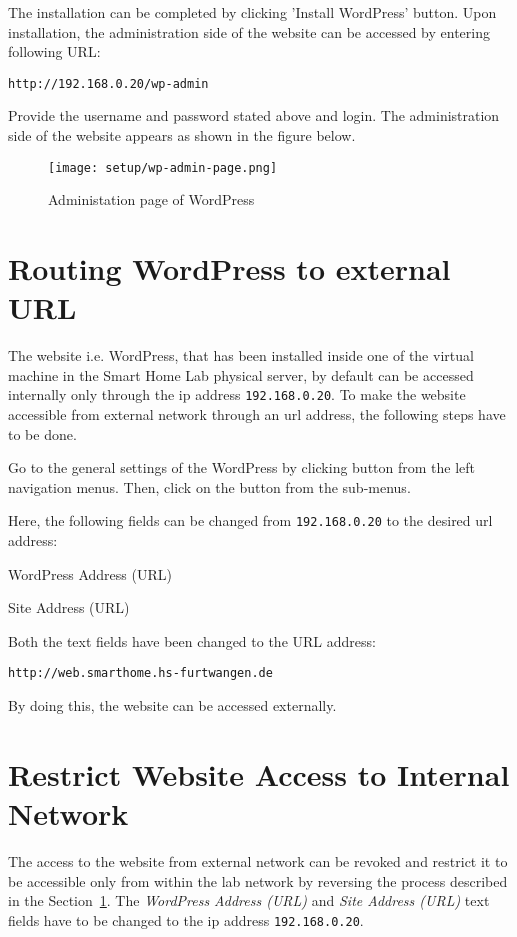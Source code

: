 The installation can be completed by clicking 'Install WordPress' button. Upon installation, the administration side of the website can be accessed by entering following URL:
\begin{lstlisting}
http://192.168.0.20/wp-admin
\end{lstlisting}

Provide the username and password stated above and login. The administration side of the website appears as shown in the figure below.

\begin{figure}[ht]
\caption{Administation page of WordPress}
\centering
\texttt{[image: setup/wp-admin-page.png]}
\end{figure}

\section{Routing WordPress to external URL} \label{sec:routing-wordpress-to-external-url}
The website i.e. WordPress, that has been installed inside one of the virtual machine in the Smart Home Lab physical server, by default can be accessed internally only through the \ac{ip} address \texttt{192.168.0.20}. To make the website accessible from external network through an \ac{url} address, the following steps have to be done.

Go to the general settings of the WordPress by clicking  button from the left navigation menus. Then, click on the  button from the sub-menus.

Here, the following fields can be changed from \texttt{192.168.0.20} to the desired \ac{url} address:
\begin{itemize*}
\item WordPress Address (URL)
\item Site Address (URL)
\end{itemize*}

Both the text fields have been changed to the URL address:
\begin{lstlisting}
http://web.smarthome.hs-furtwangen.de
\end{lstlisting}

By doing this, the website can be accessed externally.

\section{Restrict Website Access to Internal Network}
The access to the website from external network can be revoked and restrict it to be accessible only from within the lab network by reversing the process described in the Section~\ref{sec:routing-wordpress-to-external-url}. The \emph{WordPress Address (URL)} and \emph{Site Address (URL)} text fields have to be changed to the \ac{ip} address \texttt{192.168.0.20}.


